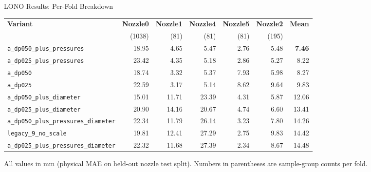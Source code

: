 \documentclass[UTF8,aspectratio=169]{ctexbeamer}
\begin{document}
\begin{frame}{LONO Results: Per-Fold Breakdown}
\small
\begin{center}
\renewcommand{\arraystretch}{1.18}
\setlength{\tabcolsep}{5pt}
\begin{tabular}{@{}lrrrrr|r@{}}
\toprule
\textbf{Variant} &
\textbf{Nozzle0} & \textbf{Nozzle1} & \textbf{Nozzle4} & \textbf{Nozzle5} & \textbf{Nozzle2} &
\textbf{Mean} \\
& \footnotesize(1038) & \footnotesize(81) & \footnotesize(81) & \footnotesize(81) & \footnotesize(195) & \\
\midrule
\rowcolor{winrow}
\texttt{a\_dp050\_plus\_pressures} & 18.95 & 4.65 & 5.47 & 2.76 & 5.48 & \textbf{7.46} \\
\texttt{a\_dp025\_plus\_pressures} & 23.42 & 4.35 & 5.18 & 2.86 & 5.27 & 8.22 \\
\texttt{a\_dp050} & 18.74 & 3.32 & 5.37 & 7.93 & 5.98 & 8.27 \\
\texttt{a\_dp025} & 22.59 & 3.17 & 5.14 & 8.62 & 9.64 & 9.83 \\
\midrule
\rowcolor{warnrow}
\texttt{a\_dp050\_plus\_diameter} & 15.01 & 11.71 & 23.39 & 4.31 & 5.87 & 12.06 \\
\rowcolor{warnrow}
\texttt{a\_dp025\_plus\_diameter} & 20.90 & 14.16 & 20.67 & 4.74 & 6.60 & 13.41 \\
\rowcolor{warnrow}
\texttt{a\_dp050\_plus\_pressures\_diameter} & 22.34 & 11.79 & 26.14 & 3.23 & 7.80 & 14.26 \\
\rowcolor{warnrow}
\texttt{legacy\_9\_no\_scale} & 19.81 & 12.41 & 27.29 & 2.75 & 9.83 & 14.42 \\
\rowcolor{warnrow}
\texttt{a\_dp025\_plus\_pressures\_diameter} & 22.32 & 11.68 & 27.39 & 2.34 & 8.67 & 14.48 \\
\bottomrule
\end{tabular}
\end{center}

\vspace{0.2em}
\footnotesize
All values in mm (physical MAE on held-out nozzle test split). Numbers in parentheses are
sample-group counts per fold.
\end{frame}
\end{document}
